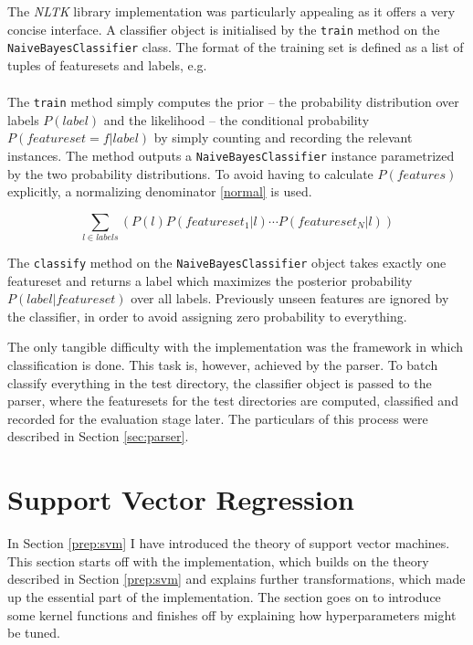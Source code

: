 \documentclass[12pt,a4paper,notitlepage,twoside]{scrbook}
\begin{document}
The \textit{NLTK} library implementation was particularly appealing as it offers a very
concise interface. A classifier object is initialised by the \texttt{train}
method on the \texttt{NaiveBayesClassifier} class. The format of the training
set is defined as a list of tuples of featuresets and labels, e.g.
\begin{gather*}
[(featureset_1, label_1), \cdots, (featureset_N,
label_N)]
\end{gather*}

The \texttt{train} method simply computes the prior -- the probability
distribution over labels \(P(label)\) and the likelihood -- the conditional
probability \(P(featureset=f|label)\) by simply counting and recording the
relevant instances. The method outputs a \texttt{NaiveBayesClassifier} instance
parametrized by the two probability distributions. To avoid having to calculate
\(P(features)\) explicitly, a normalizing denominator \ref{normal} is used.

\begin{equation} \sum_{l \in labels}(P(l)P(featureset_1|l)\cdots
	P(featureset_N|l)) \label{normal} \end{equation}

The \texttt{classify} method on the \texttt{NaiveBayesClassifier} object takes
exactly one featureset and returns a label which maximizes the posterior
probability \(P(label|featureset)\) over all labels.  Previously unseen features
are ignored by the classifier, in order to avoid assigning zero probability to
everything.

The only tangible difficulty with the implementation was the
framework in which classification is done. This task is, however, achieved by
the parser. To batch classify everything in the test directory, the classifier
object is passed to the parser, where the featuresets for the test directories
are computed, classified and recorded for the evaluation stage later. The
particulars of this process were described in Section \ref{sec:parser}.

\section{Support Vector Regression}
\label{sec:svm}
In Section \ref{prep:svm} I have introduced the theory of support vector machines. This
section starts off with the implementation, which builds on the theory described in
Section \ref{prep:svm} and explains further transformations, which made up the essential
part of the implementation. The section goes on to introduce some kernel functions and
finishes off by explaining how hyperparameters might be tuned.
\end{document}
